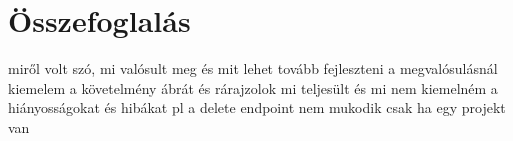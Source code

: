 \chapter{Összefoglalás}

miről volt szó, mi valósult meg és mit lehet tovább fejleszteni
a megvalósulásnál kiemelem a követelmény ábrát és rárajzolok mi teljesült és mi nem
kiemelném a hiányosságokat és hibákat pl a delete endpoint nem mukodik csak ha egy projekt van